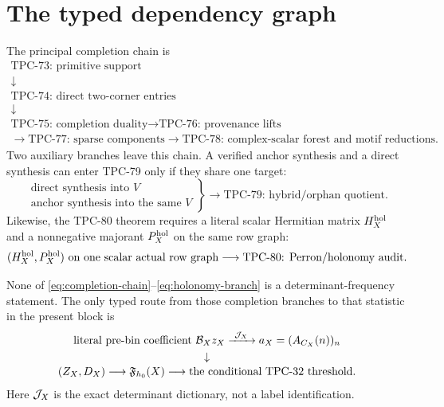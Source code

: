 \section{The typed dependency graph}
\label{sec:dependency-graph}

The principal completion chain is
\begin{equation}
\begin{gathered}
\text{TPC-73: primitive support}\\[-0.1em]
\downarrow\\[-0.1em]
\text{TPC-74: direct two-corner entries}\\[-0.1em]
\downarrow\\[-0.1em]
\text{TPC-75: completion duality}
\longrightarrow
\text{TPC-76: provenance lifts}\\[-0.1em]
\longrightarrow
\text{TPC-77: sparse components}
\longrightarrow
\text{TPC-78: complex-scalar forest and motif reductions}.
\end{gathered}
\label{eq:completion-chain}
\end{equation}
Two auxiliary branches leave this chain.  A verified anchor synthesis
and a direct synthesis can enter TPC-79 only if they share one target:
\begin{equation}
\left.
\begin{array}{c}
\text{direct synthesis into \(V\)}\\
\text{anchor synthesis into the same \(V\)}
\end{array}
\right\}
\longrightarrow
\text{TPC-79: hybrid/orphan quotient}.
\label{eq:anchor-branch}
\end{equation}
Likewise, the TPC-80 theorem requires a literal scalar Hermitian
matrix \(H_X^{\rm hol}\) and a nonnegative majorant
\(P_X^{\rm hol}\) on the same row graph:
\begin{equation}
(H_X^{\rm hol},P_X^{\rm hol})
\text{ on one scalar actual row graph}
\longrightarrow
\text{TPC-80: Perron/holonomy audit}.
\label{eq:holonomy-branch}
\end{equation}

None of \eqref{eq:completion-chain}--\eqref{eq:holonomy-branch} is a
determinant-frequency statement.  The only typed route from those
completion branches to that statistic in the present block is
\begin{equation}
\begin{gathered}
\text{literal pre-bin coefficient \(\mathcal B_Xz_X\)}
\xrightarrow{\ \mathcal J_X\ }
a_X=(A_{C_X}(n))_n\\
\downarrow\\[-0.2em]
(Z_X,D_X)
\longrightarrow
\mathfrak F_{h_0}(X)
\longrightarrow
\text{the conditional TPC-32 threshold}.
\end{gathered}
\label{eq:determinant-chain}
\end{equation}
Here \(\mathcal J_X\) is the exact determinant dictionary, not a label
identification.

